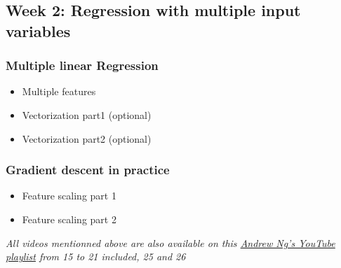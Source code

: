 \subsection*{Week 2: Regression with multiple input variables}

\subsubsection*{Multiple linear Regression}  
\begin{itemize}
  \item Multiple features
  \item Vectorization part1 (optional)
  \item Vectorization part2 (optional)
\end{itemize}

\subsubsection*{Gradient descent in practice}  
\begin{itemize}
  \item Feature scaling part 1
  \item Feature scaling part 2
\end{itemize}
\emph{All videos mentionned above are also available on this \href{https://youtube.com/playlist?list=PLkDaE6sCZn6FNC6YRfRQc_FbeQrF8BwGI&feature=shared}{Andrew Ng's YouTube playlist} from 15 to 21 included, 25 and 26}


